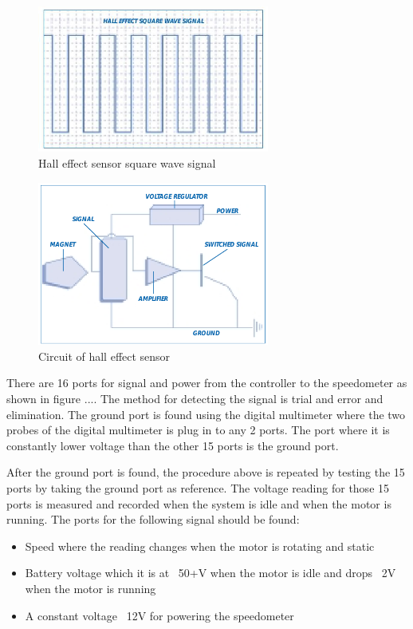 \begin{figure} [htb]
	\centering
	\includegraphics[width=3in]{images/hall_effect_signals.jpg}
	\caption{Hall effect sensor square wave signal \citep{counterpoint31}}
	\label{im:hall_signal}
\end{figure}

\begin{figure} [htb]
	\centering
	\includegraphics[width=3in]{images/hall_sensor_circuit.png}
	\caption{Circuit of hall effect sensor \citep{counterpoint31}}
	\label{im:hall_circuit}
\end{figure}

There are 16 ports for signal and power from the controller to the speedometer as shown in figure .... The method for detecting the signal is trial and error and elimination. The ground port is found using the digital multimeter where the two probes of the digital multimeter is plug in to any 2 ports. The port where it is constantly lower voltage than the other 15 ports is the ground port.

After the ground port is found, the procedure above is repeated by testing the 15 ports by taking the ground port as reference. The voltage reading for those 15 ports is measured and recorded when the system is idle and when the motor is running. The ports for the following signal should be found:

\begin{itemize}
	\item{Speed where the reading changes when the motor is rotating and static}
	\item{Battery voltage which it is at ~50+V when the motor is idle and drops ~2V when the motor is running}
	\item{A constant voltage ~12V for powering the speedometer}
\end{itemize}

